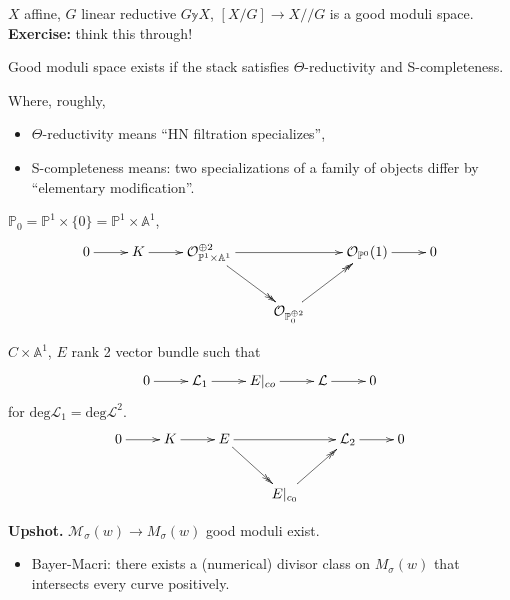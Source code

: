 \begin{example}
\label{example-good-moduli-space}
$X$ affine, $G$ linear reductive $G
\mathbb{y} X$, $[X/G] \to X/\!/G$ is a good
moduli space. {\bf Exercise:} think this
through!
\end{example}

\begin{theorem}
\label{theorem-AHLH}
Good moduli space exists if the stack
satisfies $\Theta$-reductivity and
S-completeness.
\end{theorem}

Where, roughly,
\begin{itemize}
\item $\Theta$-reductivity means ``HN
filtration specializes'',
\item S-completeness means: two
specializations of a family of objects differ
by
``elementary modification''.
\end{itemize}

\begin{example}
\label{example-elementary-modification}
$\mathbb{P}_0=\mathbb{P}^1 \times \{0\} =
\mathbb{P}^1 \times \mathbb{A}^1$,
$$
\xymatrix{
0\ar[r]&  K \ar[r]&
\mathcal{O}_{\mathbb{P}^1\times\mathbb{A}^1}
^{\oplus
2}
\ar[rr]\ar@{->>}[rd]&  &
\mathcal{O}_{\mathbb{P}^0}(1) \ar[r]&  0\\
&  &  &  \mathcal{O}_{\mathbb{P}_0^{\oplus
2}}\ar@{->>}[ur]
}
$$
\end{example}

\begin{example}
\label{example-elementary-modification-2}
$C \times \mathbb{A}^1$, $E$ rank 2 vector
bundle such that
$$
\xymatrix{
0\ar[r]&\mathcal{L}_1\ar[r]&E|_{co}\ar[r]&
\mathcal{L}\ar[r]&0
}
$$
for
$\text{deg}\mathcal{L}_1=\text{deg}
\mathcal{L}
^2$.
$$
\xymatrix{
0\ar[r]&  K \ar[r]& E\ar[rr]\ar@{->>}[rd]
&  &  \mathcal{L}_2 \ar[r]&  0\\
&  &  &  E|_{c_0}\ar@{->>}[ur]
}
$$
\end{example}

\medskip\noindent
{\bf Upshot.} $\mathcal{M}_{\sigma}(w) \to
M_{\sigma}(w)$ good moduli exist.

\begin{itemize}
\item Bayer-Macri: there exists a (numerical)
divisor class on $M_{\sigma}(w)$
that intersects every curve positively.
\end{itemize}

